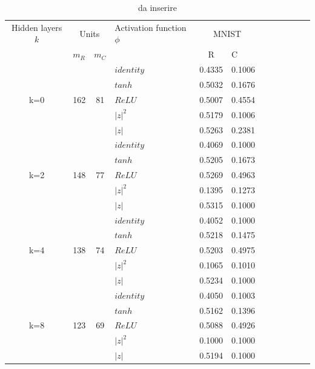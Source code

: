 \documentclass[a4paper,10pt]{article}
\begin{document}
 
 \begin{table}
  \centering
  \begin{tabular}{cp{} cp{} cp{}   cp{} cp{} cp{}}
   \cline{1-6}
   Hidden layers $k$ & \multicolumn{2}{c}{Units} $p_R$ & Activation function $\phi$ & \multicolumn{2}{c}{MNIST}\\
   \cline{2-3} \cline{5-6}
   & $m_R$ & $m_C$ & & R & C \\
   \cline{1-6}
   & & & $identity$ & 0.4335 & 0.1006 \\
   \cline{4-6}
   & & & $tanh$ & 0.5032 & 0.1676 \\
   \cline{4-6}
   k=0 & 162 & 81 & $ReLU$ & 0.5007 & 0.4554 \\
   \cline{4-6}
   & & & $|z|^2$ & 0.5179 & 0.1006 \\
   \cline{4-6}
   & & & $|z|$ & 0.5263 & 0.2381 \\
   \cline{1-6}
   
   \cline{1-6}
   & & & $identity$ & 0.4069 & 0.1000 \\
   \cline{4-6}
   & & & $tanh$ & 0.5205 & 0.1673 \\
   \cline{4-6}
   k=2 & 148 & 77 & $ReLU$ & 0.5269 & 0.4963 \\
   \cline{4-6}
   & & & $|z|^2$ & 0.1395 & 0.1273 \\
   \cline{4-6}
   & & & $|z|$ & 0.5315 & 0.1000 \\
   \cline{1-6}
   
   \cline{1-6}
   & & & $identity$ & 0.4052 & 0.1000 \\
   \cline{4-6}
   & & & $tanh$ & 0.5218 & 0.1475 \\
   \cline{4-6}
   k=4 & 138 & 74 & $ReLU$ & 0.5203 & 0.4975 \\
   \cline{4-6}
   & & & $|z|^2$ & 0.1065 & 0.1010 \\
   \cline{4-6}
   & & & $|z|$ & 0.5234 & 0.1000 \\
   \cline{1-6}
   
   \cline{1-6}
   & & & $identity$ & 0.4050 & 0.1003 \\
   \cline{4-6}
   & & & $tanh$ & 0.5162 & 0.1396 \\
   \cline{4-6}
   k=8 & 123 & 69 & $ReLU$ & 0.5088 & 0.4926 \\
   \cline{4-6}
   & & & $|z|^2$ & 0.1000 & 0.1000 \\
   \cline{4-6}
   & & & $|z|$ & 0.5194 & 0.1000 \\
   \cline{1-6}
      
  \end{tabular}
  \caption{da inserire}
  \label{MNIST2Tab}
 \end{table}
 
\end{document}
